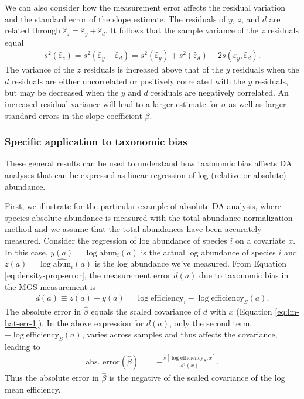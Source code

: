 \documentclass[
]{article}
\begin{document}
We can also consider how the measurement error affects the residual variation and the standard error of the slope estimate.
The residuals of \(y\), \(z\), and \(d\) are related through \(\hat \varepsilon_z = \hat \varepsilon_y + \hat \varepsilon_d\).
It follows that the sample variance of the \(z\) residuals equal
\begin{align}
  s^2(\hat \varepsilon_{z}) 
  = s^2(\hat \varepsilon_y + \hat \varepsilon_{d})
  = s^2(\hat \varepsilon_y) + s^2(\hat \varepsilon_{d}) + 2 s(\hat \varepsilon_y, \hat \varepsilon_{d}).
\end{align}
The variance of the \(z\) residuals is increased above that of the \(y\) residuals when the \(d\) residuals are either uncorrelated or positively correlated with the \(y\) residuals, but may be decreased when the \(y\) and \(d\) residuals are negatively correlated.
An increased residual variance will lead to a larger estimate for \(\sigma\) as well as larger standard errors in the slope coefficient \(\beta\).

\hypertarget{specific-application-to-taxonomic-bias}{%
\subsubsection{Specific application to taxonomic bias}\label{specific-application-to-taxonomic-bias}}

These general results can be used to understand how taxonomic bias affects DA analyses that can be expressed as linear regression of log (relative or absolute) abundance.

First, we illustrate for the particular example of absolute DA analysis, where species absolute abundance is measured with the total-abundance normalization method and we assume that the total abundances have been accurately measured.
Consider the regression of log abundance of species \(i\) on a covariate \(x\).
In this case, \(y(a)= \log \text{abun}_{i}(a)\) is the actual log abundance of species \(i\) and \(z(a)=\log \widehat{\text{abun}}_i(a)\) is the log abundance we've measured.
From Equation \eqref{eq:density-prop-error}, the measurement error \(d(a)\) due to taxonomic bias in the MGS measurement is
\begin{align}
  d(a) 
  \equiv z(a) - y(a) 
  = \log \text{efficiency}_i - \log \text{efficiency}_S(a).
\end{align}
The absolute error in \(\hat \beta\) equals the scaled covariance of \(d\) with \(x\) (Equation \eqref{eq:lm-hat-err-1}).
In the above expression for \(d(a)\), only the second term, \(- \log \text{efficiency}_S(a)\), varies across samples and thus affects the covariance, leading to
\begin{align}
  \text{abs. error}(\hat \beta)
    &= - \frac{s[\log \text{efficiency}_S, x]}{s^2(x)}.
\end{align}
Thus the absolute error in \(\hat \beta\) is the negative of the scaled covariance of the log mean efficiency.
\end{document}
